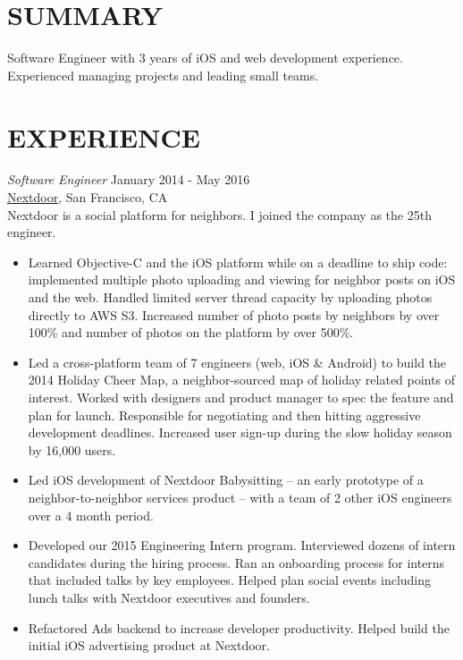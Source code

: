\documentclass[margin, 10pt]{res} %
\begin{document}
\begin{resume}

\section{SUMMARY}

Software Engineer with 3 years of iOS and web development experience. Experienced managing projects and leading small teams.


\section{EXPERIENCE}

{\sl Software Engineer} \hfill January 2014 - May 2016 \\
\href{http://www.nextdoor.com}{Nextdoor}, San Francisco, CA \\
Nextdoor is a social platform for neighbors. I joined the company as the 25th engineer.
\begin{itemize} \itemsep -2pt %
\item Learned Objective-C and the iOS platform while on a deadline to ship code: implemented multiple photo uploading and viewing for neighbor posts on iOS and the web. Handled limited server thread capacity by uploading photos directly to AWS S3. Increased number of photo posts by neighbors by over 100\% and number of photos on the platform by over 500\%.
\item Led a cross-platform team of 7 engineers (web, iOS \& Android) to build the 2014 Holiday Cheer Map, a neighbor-sourced map of holiday related points of interest. Worked with designers and product manager to spec the feature and plan for launch. Responsible for negotiating and then hitting aggressive development deadlines. Increased user sign-up during the slow holiday season by 16,000 users.
\item Led iOS development of Nextdoor Babysitting -- an early prototype of a neighbor-to-neighbor services product -- with a team of 2 other iOS engineers over a 4 month period.
\item Developed our 2015 Engineering Intern program. Interviewed dozens of intern candidates during the hiring process. Ran an onboarding process for interns that included talks by key employees. Helped plan social events including lunch talks with Nextdoor executives and founders.
\item Refactored Ads backend to increase developer productivity. Helped build the initial iOS advertising product at Nextdoor.
\end{itemize}


\end{resume}
\end{document}

